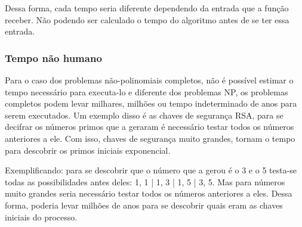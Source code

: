 \documentclass{article}
\begin{document}
Dessa forma, cada tempo seria diferente dependendo da entrada que a função receber. Não podendo ser calculado o tempo do algoritmo antes de se ter essa entrada.

\subsubsection{Tempo não humano}
\hspace{4mm} Para o caso dos problemas não-polinomiais completos, não é possível estimar o tempo necessário para executa-lo e diferente dos problemas NP, os problemas completos podem levar milhares, milhões ou tempo indeterminado de anos para serem executados. Um exemplo disso é as chaves de segurança RSA, para se decifrar os números primos que a geraram é necessário testar todos os números anteriores a ele. Com isso, chaves de segurança muito grandes, tornam o tempo para descobrir os primos iniciais exponencial.

Exemplificando: para se descobrir que o número que a gerou é o 3 e o 5 testa-se todas as possibilidades antes deles: 1, 1 | 1, 3 | 1, 5 | 3, 5. Mas para números muito grandes seria necessário testar todos os números anteriores a eles. Dessa forma, poderia levar milhões de anos para se descobrir quais eram as chaves iniciais do processo. 
\end{document}
